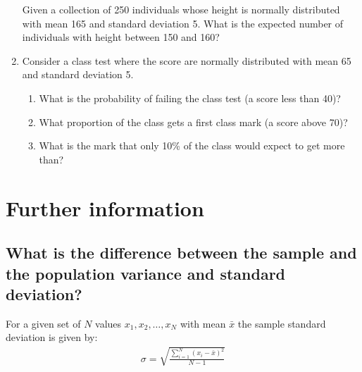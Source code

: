 \begin{enumerate}
Given a collection of 250 individuals whose height is normally distributed with
mean 165 and standard deviation 5. What is the expected number of individuals
with height between 150 and 160?

\item 

Consider a class test where the score are normally distributed with mean 65
and standard deviation 5.
\begin{enumerate}

\item 

What is the probability of failing the class test (a score less than 40)?

\item 

What proportion of the class gets a first class mark (a score above 70)?

\item 

What is the mark that only 10\% of the class would expect to get more than?

\end{enumerate}

\end{enumerate}

\section{Further information}
\label{\detokenize{tools-for-mathematics/08-statistics/why/main:further-information}}\label{\detokenize{tools-for-mathematics/08-statistics/why/main::doc}}

\subsection{What is the difference between the sample and the population variance and standard deviation?}
\label{\detokenize{tools-for-mathematics/08-statistics/why/main:what-is-the-difference-between-the-sample-and-the-population-variance-and-standard-deviation}}

For a given set of \(N\) values \(x_1, x_2, \dots, x_N\) with mean \(\bar x\) the sample
standard deviation is given by:
\begin{equation*}
\begin{split}
\sigma = \sqrt{\frac{\sum_{i=1}^N{(x_i - \bar x) ^ 2}}{N - 1}}
\end{split}
\end{equation*}

